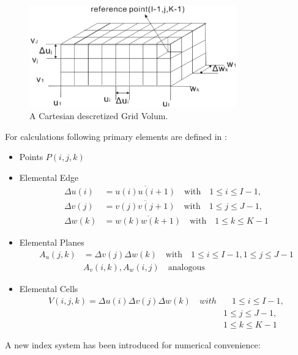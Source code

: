 \begin{figure}[!ht]
\centering
\includegraphics[width=0.8\textwidth]{bilder/grid_volum}
\caption{A Cartesian descretized Grid Volum\cite{script_FeldSim}.}
\label{fig:discretization_material}
\end{figure}
For calculations following primary elements are defined in \cite{script_FeldSim}:
\begin{itemize}
\item Points $P(i,j,k)$
\item Elemental Edge
    \begin{align*}
		\Delta u(i)&=\overline{u(i)u(i+1)}  \quad \mathrm{with}  \quad 1\leq i \leq I-1, \nonumber\\
		\Delta v(j)&=\overline{v(j)v(j+1)}  \quad \mathrm{with}  \quad 1\leq j \leq J-1, \nonumber\\
		\Delta w(k)&=\overline{w(k)w(k+1)}  \quad \mathrm{with}  \quad 1\leq k \leq K-1
		\end{align*}
\item Elemental Planes
		\begin{align*}
		A_{u}(j,k)&=\Delta v(j)\Delta w(k) \quad \mathrm{with}  \quad 1\leq i \leq I-1,1\leq j \leq J-1\nonumber\\
		&A_{v}(i,k),A_{w}(i,j)  \quad \mathrm{analogous}
		\end{align*}
\item Elemental Cells
		\begin{align*}
		V(i,j,k)=\Delta u(i)\Delta v(j)\Delta w(k)  \quad with  &\quad 1\leq i\leq I-1,\nonumber\\
		&1\leq j\leq J-1,\nonumber\\
		&1\leq k\leq K-1
		\end{align*}
\end{itemize}
A new index system has been introduced for numerical convenience:

